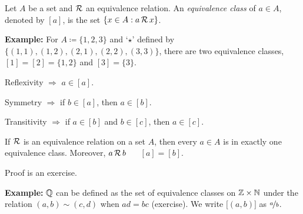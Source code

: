 \documentclass[10pt,aspectratio=149]{beamer}
\begin{document}
\begin{frame}

\begin{definition}
Let $A$ be a set and ${\mathcal{R}}$ an equivalence relation.
An \emph{equivalence class} of $a \in A$, denoted
by $[a]$, is the set $\{ x \in A : a\, {\mathcal{R}} \, x \}$.
\end{definition}

\pause
\textbf{Example:}
For $A \coloneqq \{ 1,2,3 \}$ and
`$\star$' defined by
$\bigl\{ (1,1), (1,2), (2,1), (2,2), (3,3) \bigr\}$,
there are two equivalence classes,
$[1] = [2] = \{ 1,2 \}$ and $[3] = \{ 3 \}$.

\medskip
\pause

Reflexivity $\Rightarrow$ $a \in [a]$.

\pause
Symmetry $\Rightarrow$ if $b \in [a]$, then $a \in [b]$.

\pause
Transitivity $\Rightarrow$
if $a \in [b]$ and $b \in [c]$, then $a \in [c]$.

\pause

\begin{proposition}
If ${\mathcal{R}}$ is an equivalence relation on a set $A$,
then every $a \in A$ is in exactly one
equivalence class.  Moreover, $a\, {\mathcal{R}} \, b$ ~\iffif~ $[a] = [b]$.
\end{proposition}

\pause
Proof is an exercise.

\pause
\medskip

\textbf{Example:}
${\mathbb{Q}}$ can be defined as the set of equivalence classes on
${\mathbb{Z}} \times {\mathbb{N}}$ under the relation
$(a,b) \sim (c,d)$ when $ad = bc$ (exercise).
\pause
We write
$\bigl[(a,b)\bigr]$ as $\nicefrac{a}{b}$.

\end{frame}
\end{document}

